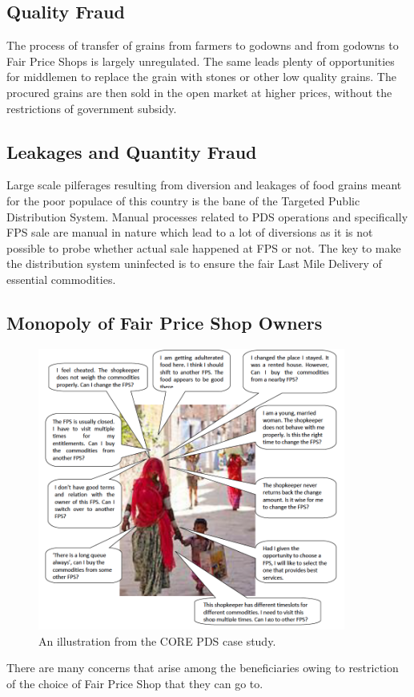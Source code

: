 \documentclass[a4paper,12pt]{extarticle}
\begin{document}
\subsection{Quality Fraud}
The process of transfer of grains from farmers to godowns and from godowns to Fair Price Shops is largely unregulated. The same leads plenty of opportunities for middlemen to replace the grain with stones or other low quality grains. The procured grains are then sold in the open market at higher prices, without the restrictions of government subsidy.

\subsection{Leakages and Quantity Fraud}
Large scale pilferages resulting from diversion and leakages of food grains meant for the poor populace of this country is the bane of the Targeted Public Distribution System. Manual processes related to PDS operations and specifically FPS sale are manual in nature which lead to a lot of diversions as it is not possible to probe whether actual sale happened at FPS or not. The key to make the distribution system uninfected is to ensure the fair Last Mile Delivery of essential commodities.



\subsection{Monopoly of Fair Price Shop Owners}
\begin{figure}
\centering
\includegraphics[width=0.9\textwidth]{CORE.png}
\caption{\label{fig:CORE}An illustration from the CORE PDS case study.}
\end{figure}
There are many concerns that arise among the beneficiaries owing to restriction of the choice of Fair Price Shop that they can go to.
\end{document}
